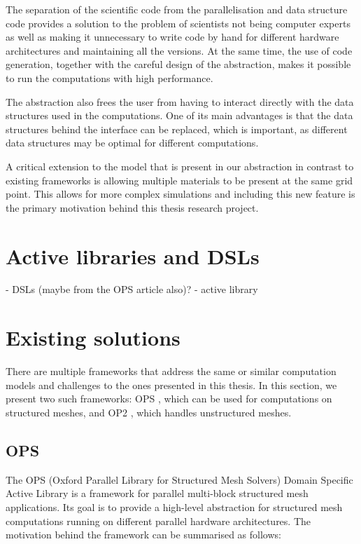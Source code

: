 \documentclass[fontsize=11pt, appendixprefix=true]{scrreprt}
\begin{document}
The separation of the scientific code from the parallelisation and data
structure code provides a solution to the problem of scientists not being
computer experts as well as making it unnecessary to write code by hand for
different hardware architectures and maintaining all the versions. At the same
time, the use of code generation, together with the careful design of the
abstraction, makes it possible to run the computations with high performance.

The abstraction also frees the user from having to interact directly with the
data structures used in the computations. One of its main advantages is that the
data structures behind the interface can be replaced, which is important, as
different data structures may be optimal for different computations.

A critical extension to the model that is present in our abstraction in contrast
to existing frameworks is allowing multiple materials to be present at the same
grid point. This allows for more complex simulations and including this new
feature is the primary motivation behind this thesis research project.

\section{Active libraries and DSLs}
\label{eDSLs}

- DSLs (maybe from the OPS article also)?
- active library

\section{Existing solutions}

There are multiple frameworks that address the same or similar computation
models and challenges to the ones presented in this thesis. In this section, we
present two such frameworks: OPS \cite{OPS}, which can be used for computations
on structured meshes, and OP2 \cite{OP2}, which handles unstructured meshes.

\subsection{OPS}


The OPS (Oxford Parallel Library for Structured Mesh Solvers) Domain Specific
Active Library is a framework for parallel multi-block structured mesh
applications. Its goal is to provide a high-level abstraction for structured
mesh computations running on different parallel hardware architectures. The
motivation behind the framework can be summarised as follows:
\end{document}
